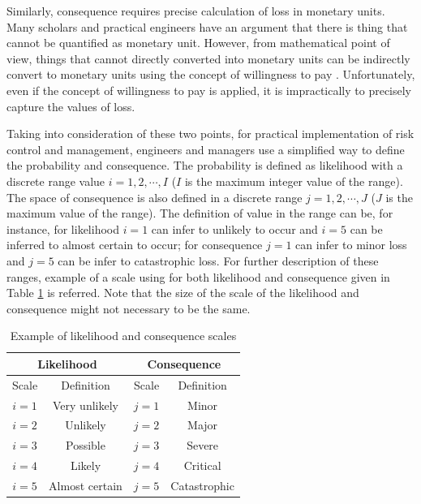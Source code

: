 \documentclass[10pt,halfline,a4paper]{ouparticle}
\begin{document}
Similarly, consequence requires precise calculation of loss in monetary units. Many scholars and practical engineers have an argument that there is thing that cannot be quantified as monetary unit. However, from mathematical point of view, things that cannot directly converted into monetary units can be indirectly  convert to monetary units using the concept of willingness to pay \citep{Breidert2006,Adey2012}. Unfortunately, even if the concept of willingness to pay is applied, it is impractically to precisely capture the values of loss. 

Taking into consideration of these two points, for practical implementation of risk control and management, engineers and managers use a simplified way to define the probability and consequence. The probability is defined as likelihood with a discrete range value $i=1,2,\cdots, I$ ($I$ is the maximum integer value of the range). The space of consequence is also defined in a discrete range $j=1,2,\cdots,J$ ($J$ is the maximum value of the range). The definition of value in the range can be, for instance, for likelihood $i=1$ can infer to unlikely to occur and $i=5$ can be inferred to almost certain to occur; for consequence $j=1$ can infer to minor loss and $j=5$ can be infer to catastrophic loss. For further description of these ranges, example of a scale using for both likelihood and consequence given in Table \ref{tbl_likeconse} is referred. Note that the size of the scale of the likelihood and consequence might not necessary to be the same. 

\begin{table}
\centering
\caption{Example of likelihood and consequence scales} 
\begin{tabular}{l|l|l|l}
\hline
\multicolumn{2}{c|}{Likelihood} & \multicolumn{2}{c}{Consequence} \\ 
\hline
\multicolumn{1}{c|}{Scale} & \multicolumn{1}{c|}{Definition} & \multicolumn{1}{c|}{Scale} & \multicolumn{1}{c}{Definition} \\ 
\hline
\multicolumn{1}{c|}{$i=1$} & \multicolumn{1}{c|}{Very unlikely} & \multicolumn{1}{c|}{$j=1$} & \multicolumn{1}{c}{Minor} \\ 
\multicolumn{1}{c|}{$i=2$} & \multicolumn{1}{c|}{Unlikely} & \multicolumn{1}{c|}{$j=2$} & \multicolumn{1}{c}{Major} \\ 
\multicolumn{1}{c|}{$i=3$} & \multicolumn{1}{c|}{Possible} & \multicolumn{1}{c|}{$j=3$} & \multicolumn{1}{c}{Severe} \\ 
\multicolumn{1}{c|}{$i=4$} & \multicolumn{1}{c|}{Likely} & \multicolumn{1}{c|}{$j=4$} & \multicolumn{1}{c}{Critical} \\ 
\multicolumn{1}{c|}{$i=5$} & \multicolumn{1}{c|}{Almost certain} & \multicolumn{1}{c|}{$j=5$} & \multicolumn{1}{c}{Catastrophic} \\ 
\hline
\end{tabular}
\label{tbl_likeconse}
\end{table}
\end{document}
